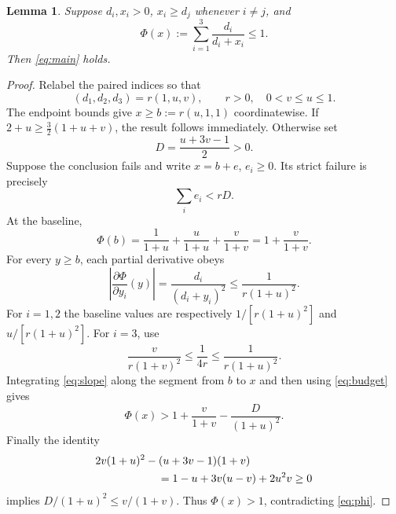 \documentclass[11pt]{article}
\newtheorem{lemma}{Lemma}
\begin{document}
\begin{lemma}\label{lem:algebra}
Suppose \(d_i,x_i>0\), \(x_i\geq d_j\) whenever \(i\ne j\), and
\begin{equation}\label{eq:phi}
\Phi(x):=\sum_{i=1}^3\frac{d_i}{d_i+x_i}\leq1.
\end{equation}
Then \eqref{eq:main} holds.
\end{lemma}
\begin{proof}
Relabel the paired indices so that
\[
(d_1,d_2,d_3)=r(1,u,v),\qquad r>0,\quad0<v\leq u\leq1.
\]
The endpoint bounds give \(x\geq b:=r(u,1,1)\) coordinatewise.
If \(2+u\geq\frac32(1+u+v)\), the result follows immediately.
Otherwise set
\[
D=\frac{u+3v-1}{2}>0.
\]
Suppose the conclusion fails and write \(x=b+e\), \(e_i\geq0\).
Its strict failure is precisely
\begin{equation}\label{eq:budget}
\sum_i e_i<rD.
\end{equation}
At the baseline,
\[
\Phi(b)=\frac1{1+u}+\frac{u}{1+u}+\frac{v}{1+v}
=1+\frac{v}{1+v}.
\]
For every \(y\geq b\), each partial derivative obeys
\begin{equation}\label{eq:slope}
\left|\frac{\partial\Phi}{\partial y_i}(y)\right|
=\frac{d_i}{(d_i+y_i)^2}\leq \frac1{r(1+u)^2}.
\end{equation}
For \(i=1,2\) the baseline values are respectively
\(1/[r(1+u)^2]\) and \(u/[r(1+u)^2]\).
For \(i=3\), use
\[
\frac{v}{r(1+v)^2}\leq\frac1{4r}
\leq\frac1{r(1+u)^2}.
\]
Integrating \eqref{eq:slope} along the segment from \(b\) to \(x\)
and then using \eqref{eq:budget} gives
\[
\Phi(x)>1+\frac{v}{1+v}-\frac{D}{(1+u)^2}.
\]
Finally the identity
\begin{align*}
&2v(1+u)^2-(u+3v-1)(1+v)\\
&\hspace{20mm}=1-u+3v(u-v)+2u^2v\geq0
\end{align*}
implies \(D/(1+u)^2\leq v/(1+v)\).
Thus \(\Phi(x)>1\), contradicting \eqref{eq:phi}.
\end{proof}
\end{document}
